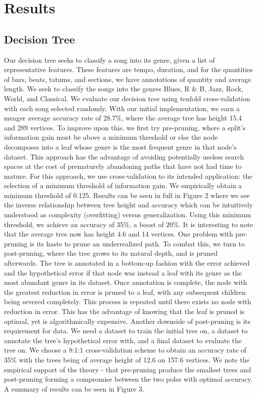 \documentclass[11pt, twocolumn]{article}
\begin{document}
\section{Results}
\subsection{Decision Tree}
    Our decision tree seeks to classify a song into its genre, given a list of representative features. These features are tempo, duration, and for the quantities of bars, beats, tatums, and sections, we have annotations of quantity and average length. We seek to classify the songs into the genres Blues, R \& B, Jazz, Rock, World, and Classical. We evaluate our decision tree using tenfold cross-validation with each song selected randomly. With our initial implementation, we earn a meager average accuracy rate of 28.7\%, where the average tree has height 15.4 and 289 vertices. 
    To improve upon this, we first try pre-pruning, where a split’s information gain must be above a minimum threshold or else the node decomposes into a leaf whose genre is the most frequent genre in that node’s dataset. This approach has the advantage of avoiding potentially useless search spaces at the cost of prematurely abandoning paths that have not had time to mature. For this approach, we use cross-validation to its intended application: the selection of a minimum threshold of information gain. We empirically obtain a minimum threshold of 0.125. Results can be seen in full in Figure 2 where we see the inverse relationship between tree height and accuracy which can be intuitively understood as complexity (overfitting) versus generalization. Using this minimum threshold, we achieve an accuracy of 35\%, a boost of 20\%. It is interesting to note that the average tree now has height 4.6 and 14 vertices. One problem with pre-pruning is its haste to prune an underrealized path. 
    To combat this, we turn to post-pruning, where the tree grows to its natural depth, and is pruned afterwards. The tree is annotated in a bottom-up fashion with the error achieved and the hypothetical error if that node was instead a leaf with its genre as the most abundant genre in its dataset. Once annotation is complete, the node with the greatest reduction in error is pruned to a leaf, with any subsequent children being severed completely. This process is repeated until there exists no node with reduction in error. This has the advantage of knowing that the leaf is pruned is optimal, yet is algorithmically expensive. Another downside of post-pruning is its requirement for data. We need a dataset to train the initial tree on, a dataset to annotate the tree’s hypothetical error with, and a final dataset to evaluate the tree on. We choose a 8:1:1 cross-validation scheme to obtain an accuracy rate of 35\% with the trees being of average height of 12.6 on 157.6 vertices. We note the empirical support of the theory - that pre-pruning produce the smallest trees and post-pruning forming a compromise between the two poles with optimal accuracy. A summary of results can be seen in Figure 3.
\end{document}
